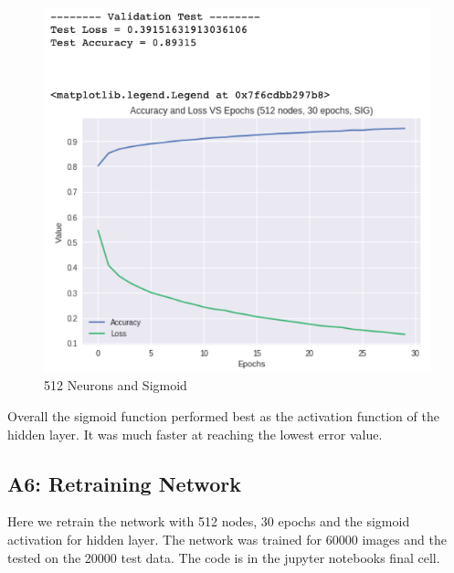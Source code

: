 \documentclass[a4paper, 12pt]{article}
\begin{document}
    \begin{figure}[h!]
        \centering
        \captionsetup{justification=centering}
        \includegraphics[scale = 0.3]{512_SIG.png}
        \caption{512 Neurons and Sigmoid}
    \end{figure}

    Overall the sigmoid function performed best as the activation function of the hidden layer. It was much faster at reaching the lowest error value.

    \subsection{A6: Retraining Network}

    Here we retrain the network with 512 nodes, 30 epochs and the sigmoid activation for hidden layer. The network was trained for 60000 images and the tested on the 20000 test data. The code is in the jupyter notebooks final cell.
\end{document}
